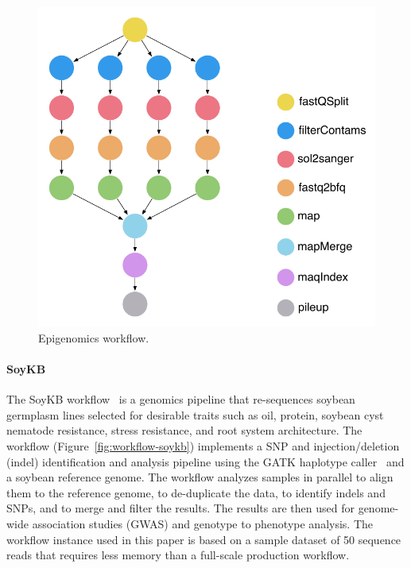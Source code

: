 \begin{figure}[!htb]
	\centering
	\includegraphics[width=0.75\linewidth]{figures/workflow-genome}
	\caption{Epigenomics workflow.}
	\label{fig:workflow-genome}
\end{figure}

\paragraph{\textbf{SoyKB}}
The SoyKB workflow~\cite{soybean, Joshi01012014} is a genomics pipeline 
that re-sequences soybean germplasm lines selected for desirable traits such 
as oil, protein, soybean cyst nematode resistance, stress resistance, and root 
system architecture. The workflow (Figure~\ref{fig:workflow-soykb}) 
implements a SNP and injection/deletion (indel) identification and analysis 
pipeline using the GATK haplotype caller~\cite{gatk} and a soybean reference 
genome. The workflow analyzes samples in parallel to align them to the reference 
genome, to de-duplicate the data, to identify indels and SNPs, and to merge and 
filter the results. The results are then used for genome-wide association studies 
(GWAS) and genotype to phenotype analysis. The workflow instance used in this 
paper is based on a sample dataset of 50 sequence reads that requires less 
memory than a full-scale production workflow.

